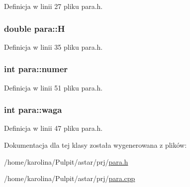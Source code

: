 Definicja w linii 27 pliku para.\-h.

\hypertarget{classpara_aa042f1889262d8c7f34c50f1e0584086}{
\subsubsection[{H}]{\setlength{\rightskip}{0pt plus 5cm}double para\-::\-H}}\label{classpara_aa042f1889262d8c7f34c50f1e0584086}


Definicja w linii 35 pliku para.\-h.

\hypertarget{classpara_ad00013e542cdbfd535beca41cb8d1e1f}{
\subsubsection[{numer}]{\setlength{\rightskip}{0pt plus 5cm}int para\-::numer}}\label{classpara_ad00013e542cdbfd535beca41cb8d1e1f}


Definicja w linii 51 pliku para.\-h.

\hypertarget{classpara_a6ccf50eedaaef6b86ec2c051af6ccf8d}{
\subsubsection[{waga}]{\setlength{\rightskip}{0pt plus 5cm}int para\-::waga}}\label{classpara_a6ccf50eedaaef6b86ec2c051af6ccf8d}


Definicja w linii 47 pliku para.\-h.



Dokumentacja dla tej klasy została wygenerowana z plików\-:\begin{DoxyCompactItemize}
\item 
/home/karolina/\-Pulpit/astar/prj/\hyperlink{para_8h}{para.\-h}\item 
/home/karolina/\-Pulpit/astar/prj/\hyperlink{para_8cpp}{para.\-cpp}\end{DoxyCompactItemize}

